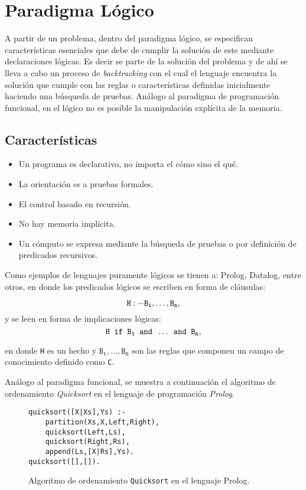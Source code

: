 \documentclass[12pt, oneside]{article}
\begin{document}
\section*{Paradigma Lógico}

A partir de un problema, dentro del paradigma lógico, se especifican características esenciales que debe de cumplir la solución de este mediante declaraciones lógicas. Es decir se parte de la solución del problema y de ahí se lleva a cabo un proceso de {\it backtracking} con el cual el lenguaje encuentra la solución que cumple con las reglas o características definidas inicialmente haciendo una búsqueda de pruebas.
Análogo al paradigma de programación funcional, en el lógico no es posible la manipulación explícita de la memoria\cite{javo_notas}.

\subsection*{Características}

\begin{itemize}
	\item Un programa es declarativo, no importa el cómo sino el qué.
	\item La orientación es a pruebas formales\cite{favio_notas}.
	\item El control basado en recursión.
	\item No hay memoria implícita.
	\item Un cómputo se expresa mediante la búsqueda de pruebas o por definición de predicados recursivos.
\end{itemize} 

Como ejemplos de lenguajes puramente lógicos se tienen a: Prolog, Datalog, entre otros, en donde los predicados lógicos se escriben en forma de cláusulas:

\[
	{\tt H :- B_{1}, \dots, B_{n}},
\]
\noindent y se leen en forma de implicaciones lógicas:
\[
	{\tt H \texttt{ if } B_{1} \texttt{ and } \dots \texttt{ and } B_{n}},
\]

en donde {\tt H} es un hecho y $\mathtt{B_{1},\dots,B_{n}}$ son las reglas que componen un campo de conocimiento definido como {\tt C}.

Análogo al paradigma funcional, se muestra a continuación el algoritmo de ordenamiento {\it Quicksort} en el lenguaje de programación {\it Prolog}\cite{javo_notas}.

\begin{figure}[H]
\begin{verbatim}
quicksort([X|Xs],Ys) :-
	partition(Xs,X,Left,Right),
	quicksort(Left,Ls),
	quicksort(Right,Rs),
	append(Ls,[X|Rs],Ys).
quicksort([],[]).
\end{verbatim}
\caption{Algoritmo de ordenamiento {\tt Quicksort} en el lenguaje Prolog.}
\label{}
\end{figure}
\end{document}

